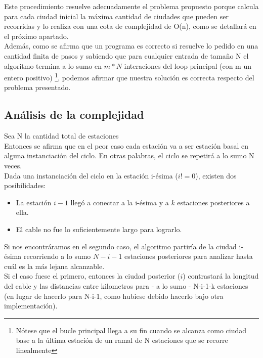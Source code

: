Este procedimiento resuelve adecuadamente el problema propuesto porque calcula para cada ciudad inicial la máxima cantidad de ciudades que pueden ser recorridas y lo realiza con una cota de complejidad de O(n), como se detallará en el próximo apartado.\\

Además, como se afirma que un programa es correcto si resuelve lo pedido en una cantidad finita de pasos y sabiendo que para cualquier entrada de tama\~no N el algoritmo termina a lo sumo en $m*N$ interaciones del loop principal (con m un entero positivo) \footnote{Nótese que el bucle principal llega a su fin cuando se alcanza como ciudad base a la última estación de un ramal de N estaciones que se recorre linealmente}, podemos afirmar que nuestra solución es correcta respecto del problema presentado.\\


\newpage
\subsection{An\'alisis de la complejidad}


Sea N la cantidad total de estaciones \\

Entonces se afirma que en el peor caso cada estación va a ser estación basal en alguna instanciación del ciclo. En otras palabras, el ciclo se repetirá a lo sumo N veces.\\

Dada una instanciación del ciclo en la estación i-ésima ($i != 0$), existen dos posibilidades:
\begin{itemize}
\item	La estación $i-1$ llegó a conectar a la i-ésima y a $k$ estaciones posteriores a ella.
\item	El cable no fue lo suficientemente largo para lograrlo.
\end{itemize}

Si nos encontráramos en el segundo caso, el algoritmo partiría de la ciudad i-ésima recorriendo a lo sumo $N-i-1$ estaciones posteriores para analizar hasta cuál es la más lejana alcanzable.\\

Si el caso fuese el primero, entonces la ciudad posterior ($i$) contrastará la longitud del cable y las distancias entre kilometros para - a lo sumo - N-i-1-k estaciones (en lugar de hacerlo para N-i-1, como hubiese debido hacerlo bajo otra implementación).\\

